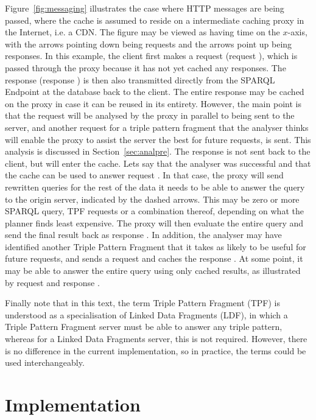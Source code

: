 Figure~\ref{fig:messaging} illustrates the case where HTTP messages
are being passed, where the cache is assumed to reside on a
intermediate caching proxy in the Internet, i.e. a CDN. The figure
may be viewed as having time on the $x$-axis, with the arrows pointing
down being requests and the arrows point up being responses. In this
example, the client first makes a request (request ), which
is passed through the proxy because it has not yet cached any
responses. The response (response ) is then also
transmitted directly from the SPARQL Endpoint at the database back to
the client. The entire response may be cached on the proxy in case it
can be reused in its entirety. However, the main point is that the
request will be analysed by the proxy in parallel to being sent to the
server, and another request  for a triple pattern fragment
that the analyser thinks will enable the proxy to assist the server
the best for future requests, is sent. This analysis is discussed in
Section~\ref{sec:analpre}. The response  is not sent back
to the client, but will enter the cache. Lets say that the analyser
was successful and that the cache can be used to answer request
. In that case, the proxy will send rewritten queries for
the rest of the data it needs to be able to answer the query to the
origin server, indicated by the dashed arrows. This may be zero or more SPARQL
query, TPF requests or a combination thereof, depending on what the
planner finds least expensive. The proxy will then evaluate the entire
query and send the final result back as response . In
addition, the analyser may have identified another Triple Pattern
Fragment that it takes as likely to be useful for future requests, and
sends a request and caches the response . At some point, it
may be able to answer the entire query using only cached results, as
illustrated by request and response .

Finally note that in this text, the term Triple Pattern Fragment (TPF)
is understood as a specialisation of Linked Data Fragments (LDF), in
which a Triple Pattern Fragment server must be able to answer any
triple pattern, whereas for a Linked Data Fragments server, this is
not required. However, there is no difference in the current
implementation, so in practice, the terms could be used
interchangeably.

\section{Implementation}\label{sec:impl}

